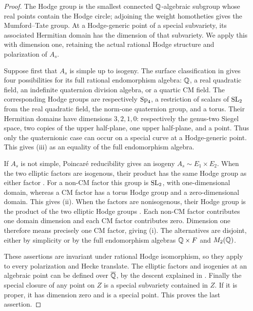 \begin{proof}
The Hodge group is the smallest connected $\mathbb Q$-algebraic subgroup
whose real points contain the Hodge circle; adjoining the weight
homotheties gives the Mumford--Tate group.
At a Hodge-generic point of a special subvariety, its associated
Hermitian domain has the dimension of that subvariety. We apply this
with dimension one, retaining the actual rational Hodge structure and
polarization of $A_s$.

Suppose first that $A_s$ is simple up to isogeny. The surface
classification in \cite[\S2(2.2)]{MoonenZarhin1999} gives four
possibilities for its full rational endomorphism algebra: $\mathbb Q$, a
real quadratic field, an indefinite quaternion division algebra, or
a quartic CM field. The corresponding Hodge groups are respectively
$\operatorname{Sp}_4$, a restriction of scalars of $\operatorname{SL}_2$ from the real quadratic
field, the norm-one quaternion group, and a torus. Their Hermitian
domains have dimensions $3,2,1,0$: respectively the genus-two Siegel
space, two copies of the upper half-plane, one upper half-plane, and
a point. Thus only the quaternionic case can occur on a special curve
at a Hodge-generic point. This gives \textup{(iii)} as an equality of
the full endomorphism algebra.

If $A_s$ is not simple, Poincar\'e reducibility gives an isogeny
$A_s\sim E_1\times E_2$. When the two elliptic factors are isogenous,
their product has the same Hodge group as either factor
\cite[\S1(1.2)]{MoonenZarhin1999}. For a non-CM factor this group
is $\operatorname{SL}_2$, with one-dimensional domain, whereas a CM factor has
a torus Hodge group and a zero-dimensional domain. This gives
\textup{(ii)}. When the factors are nonisogenous, their Hodge group
is the product of the two elliptic Hodge groups
\cite[Corollary~(3.9)]{MoonenZarhin1999}. Each non-CM factor contributes
one domain dimension and each CM factor contributes zero. Dimension
one therefore means precisely one CM factor, giving \textup{(i)}.
The alternatives are disjoint, either by simplicity or by the full
endomorphism algebras $\mathbb Q\times F$ and $M_2(\mathbb Q)$.

These assertions are invariant under rational Hodge isomorphism, so
they apply to every polarization and Hecke translate. The elliptic
factors and isogenies at an algebraic point can be defined over
$\overline{\mathbb Q}$, by the descent explained in . Finally the
special closure of any point on $Z$ is a special subvariety contained
in $Z$. If it is proper, it has dimension zero and is a special point.
This proves the last assertion.
\end{proof}

